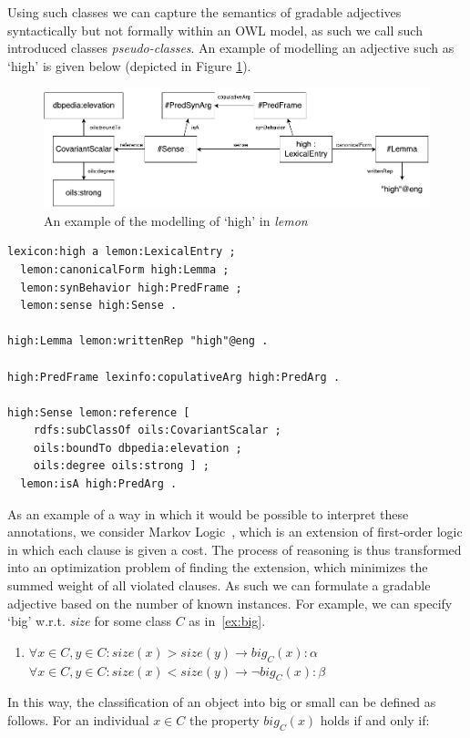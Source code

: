 \documentclass[11pt]{article}
\begin{document}
Using such classes we can capture the semantics of gradable adjectives 
syntactically but not formally within an OWL model, as such we call such 
introduced classes \emph{pseudo-classes}. An example of modelling an adjective 
such as `high' is given below (depicted in Figure \ref{high-example}).

\begin{figure}
\includegraphics[width=\textwidth]{high-example}
\caption{An example of the modelling of `high' in \emph{lemon}\label{high-example}}
\end{figure}

\begin{verbatim}
lexicon:high a lemon:LexicalEntry ;
  lemon:canonicalForm high:Lemma ;
  lemon:synBehavior high:PredFrame ;
  lemon:sense high:Sense .

high:Lemma lemon:writtenRep "high"@eng .

high:PredFrame lexinfo:copulativeArg high:PredArg .

high:Sense lemon:reference [
    rdfs:subClassOf oils:CovariantScalar ;
    oils:boundTo dbpedia:elevation ;
    oils:degree oils:strong ] ;
  lemon:isA high:PredArg .
\end{verbatim}

As an example of a way in which it would be possible to interpret these 
annotations, we consider Markov Logic~\cite{richardson2006markov}, which is an 
extension of first-order logic in which each clause is given a cost. The process 
of reasoning is thus transformed into an optimization problem of finding the 
extension, which minimizes the summed weight of all violated clauses. As such we
can formulate a gradable adjective based on the number of known instances. 
For example, we can specify `big' w.r.t. \emph{size} for some class $C$ as in~\ref{ex:big}.
%
\begin{enumerate}[resume]
\item $\forall x \in C, y \in C : size(x) > size(y) \rightarrow big_C(x) : \alpha$ \\
$\forall x \in C, y \in C : size(x) < size(y) \rightarrow \neg big_C(x) : \beta$
\label{ex:big}
\end{enumerate}
%
In this way, the classification of an object into big or small can be defined as follows.
For an individual $x \in C$ the property $big_C(x)$ holds if and only if: 
\end{document}
